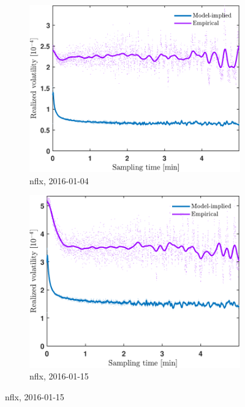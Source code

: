 \documentclass[11pt, a4paper]{thesis}  %
\begin{document}
\begin{figure}[H]
    \begin{subfigure}[b]{0.3\textwidth}
        \centering
        \includegraphics[width=\textwidth]{./SignaturePlot/NFLX/20160104/signature_plot_predicted_vs_measured.pdf}
        \caption{\ac{nflx}, 2016-01-04}
        \label{figure:results:signature_plot:nflx:20160104}
    \end{subfigure}
    \hfill
    \begin{subfigure}[b]{0.3\textwidth}
        \centering
        \includegraphics[width=\textwidth]{./SignaturePlot/NFLX/20160115/signature_plot_predicted_vs_measured.pdf}
        \caption{\ac{nflx}, 2016-01-15}

\end{subfigure}
\end{figure}
\end{document}
